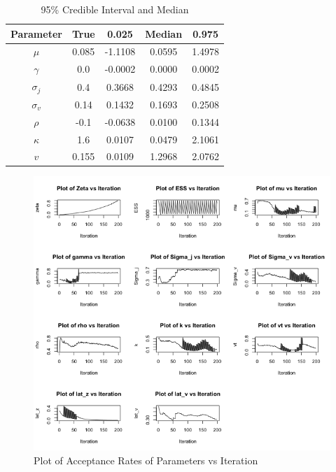 \documentclass[12pt]{article}
\theoremstyle{definition}
\begin{document}
\begin{table}
\centering
\begin{tabular}{|c c c c c|} 
 \hline
 Parameter & True & 0.025 & Median & 0.975 \\
 \hline
 $\mu$ & 0.085 & -1.1108 & 0.0595 &1.4978 \\
 $\gamma$ & 0.0 & -0.0002 & 0.0000 & 0.0002 \\
 $\sigma_{j}$ & 0.4 & 0.3668 & 0.4293 & 0.4845\\
 $\sigma_{v}$ & 0.14 & 0.1432 & 0.1693 &0.2508\\
 $\rho$ & -0.1 & -0.0638 & 0.0100 & 0.1344\\
 $\kappa$ & 1.6 & 0.0107 & 0.0479 & 2.1061\\
 $v$ & 0.155& 0.0109 & 1.2968 & 2.0762\\ 
 \hline
\end{tabular}
\caption{95\% Credible Interval and Median}
\label{table:1}
\end{table}
\begin{figure}
\centering
\includegraphics[scale=0.7]{acc_rates}
\caption{Plot of Acceptance Rates of Parameters vs Iteration}
\end{figure}
\end{document}

